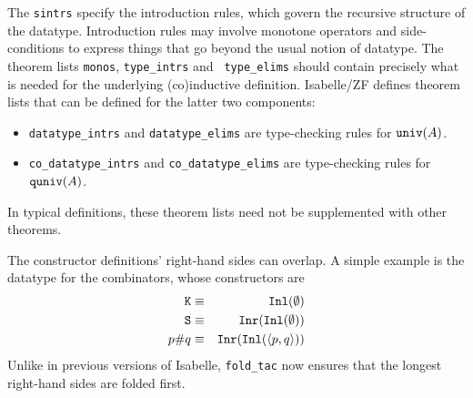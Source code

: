 The {\tt sintrs} specify the introduction rules, which govern the recursive
structure of the datatype.  Introduction rules may involve monotone operators
and side-conditions to express things that go beyond the usual notion of
datatype.  The theorem lists {\tt monos}, {\tt type\_intrs} and {\tt
type\_elims} should contain precisely what is needed for the underlying
(co)inductive definition.  Isabelle/ZF defines theorem lists that can be
defined for the latter two components:
\begin{itemize}
\item {\tt datatype\_intrs} and {\tt datatype\_elims} are type-checking rules
for ${\tt univ}(A)$.
\item {\tt co\_datatype\_intrs} and {\tt co\_datatype\_elims} are type-checking
rules for ${\tt quniv}(A)$.
\end{itemize}
In typical definitions, these theorem lists need not be supplemented with
other theorems.

The constructor definitions' right-hand sides can overlap.  A
simple example is the datatype for the combinators, whose constructors are 
\begin{eqnarray*}
  {\tt K} & \equiv & {\tt Inl}(\emptyset) \\
  {\tt S} & \equiv & {\tt Inr}({\tt Inl}(\emptyset)) \\
  p{\tt\#}q & \equiv & {\tt Inr}({\tt Inl}(\langle p,q\rangle)) 
\end{eqnarray*}
Unlike in previous versions of Isabelle, \verb|fold_tac| now ensures that the
longest right-hand sides are folded first.

\fi

